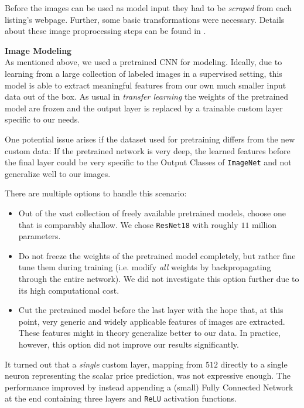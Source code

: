 Before the images can be used as model input they had to be \emph{scraped} from each listing's webpage.
Further, some basic transformations were necessary.
Details about these image proprocessing steps can be found in .


\textbf{Image Modeling} \\
As mentioned above, we used a pretrained CNN for modeling.
Ideally, due to learning from a large collection of labeled images in a supervised setting, this model is able to extract meaningful features from our own much smaller input data out of the box.
As usual in \emph{transfer learning} the weights of the pretrained model are frozen and the output layer is replaced by a trainable custom layer specific to our needs.

One potential issue arises if the dataset used for pretraining differs from the new custom data:
If the pretrained network is very deep, the learned features before the final layer could be very specific to the Output Classes of \texttt{ImageNet} and not generalize well to our images.

There are multiple options to handle this scenario:
\begin{itemize}
  \item Out of the vast collection of freely available pretrained models, choose one that is comparably shallow.
        We chose \texttt{ResNet18} with roughly $11$ million parameters.
  \item Do not freeze the weights of the pretrained model completely, but rather fine tune them during training (i.e. modify \emph{all} weights by backpropagating through the entire network).
        We did not investigate this option further due to its high computational cost.
  \item Cut the pretrained model before the last layer with the hope that, at this point, very generic and widely applicable features of images are extracted.
        These features might in theory generalize better to our data.
        In practice, however, this option did not improve our results significantly.
\end{itemize}

It turned out that a \emph{single} custom layer, mapping from $512$ directly to a single neuron representing the scalar price prediction, was not expressive enough.
The performance improved by instead appending a (small) Fully Connected Network at the end containing three layers and \texttt{ReLU} activation functions.

